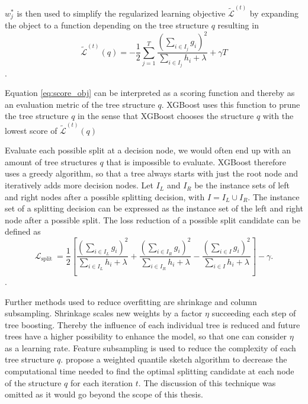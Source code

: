 \documentclass[12pt,a4paper]{article}
\begin{document}
\(w_{j}^{*}\) is then used to simplify the regularized learning objective \(\tilde{\mathcal{L}}^{(t)}\) by expanding the object to a function depending on the tree structure \(q\) resulting in
\begin{equation}
\tilde{\mathcal{L}}^{(t)}(q)=-\frac{1}{2} \sum_{j=1}^{T} \frac{\left(\sum_{i \in I_{j}} g_{i}\right)^{2}}{\sum_{i \in I_{j}} h_{i}+\lambda}+\gamma T
\label{eq:score_obj}
\end{equation}.

Equation \ref{eq:score_obj} can be interpreted as a scoring function and thereby as an evaluation metric of the tree structure \(q\). XGBoost uses this function to prune the tree structure \(q\) in the sense that XGBoost chooses the structure \(q\) with the lowest score of \(\tilde{\mathcal{L}}^{(t)}(q)\)

Evaluate each possible split at a decision node, we would often end up with an amount of tree structures \(q\) that is impossible to evaluate. XGBoost therefore uses a greedy algorithm, so that a tree always starts with just the root node and iteratively adds more decision nodes. Let \(I_L\) and \(I_R\) be the instance sets of left and right nodes after a possible splitting decision, with \(I = I_L \cup I_R\). The instance set of a splitting decision can be expressed as the instance set of the left and right node after a possible split. The loss reduction of a possible split candidate can be defined as
\begin{equation}
\mathcal{L}_{\text {split }}=\frac{1}{2}\left[\frac{\left(\sum_{i \in I_{L}} g_{i}\right)^{2}}{\sum_{i \in I_{L}} h_{i}+\lambda}+\frac{\left(\sum_{i \in I_{R}} g_{i}\right)^{2}}{\sum_{i \in I_{R}} h_{i}+\lambda}-\frac{\left(\sum_{i \in I} g_{i}\right)^{2}}{\sum_{i \in I} h_{i}+\lambda}\right]-\gamma.
\label{eq:split_loss}
\end{equation}.

Further methods used to reduce overfitting are shrinkage and column subsampling. Shrinkage scales new weights by a factor \(\eta\) succeeding each step of tree boosting. Thereby the influence of each individual tree is reduced and future trees have a higher possibility to enhance the model, so that one can consider \(\eta\) as a learning rate. Feature subsampling is used to reduce the complexity of each tree structure \(q\). \textcite{Chen2016} propose a weighted quantile sketch algorithm to decrease the computational time needed to find the optimal splitting candidate at each node of the structure \(q\) for each iteration \(t\). The discussion of this technique was omitted as it would go beyond the scope of this thesis.
\end{document}
